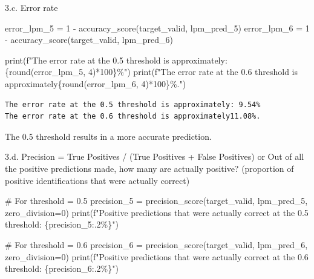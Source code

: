 \documentclass[
  11pt,
  letterpaper,
  DIV=11,
  numbers=noendperiod]{scrartcl}
\newenvironment{Shaded}{\begin{snugshade}}{\end{snugshade}}
\newcommand{\BuiltInTok}[1]{\textcolor[rgb]{0.00,0.23,0.31}{#1}}
\newcommand{\CommentTok}[1]{\textcolor[rgb]{0.37,0.37,0.37}{#1}}
\newcommand{\DecValTok}[1]{\textcolor[rgb]{0.68,0.00,0.00}{#1}}
\newcommand{\NormalTok}[1]{\textcolor[rgb]{0.00,0.23,0.31}{#1}}
\newcommand{\OperatorTok}[1]{\textcolor[rgb]{0.37,0.37,0.37}{#1}}
\newcommand{\SpecialCharTok}[1]{\textcolor[rgb]{0.37,0.37,0.37}{#1}}
\newcommand{\SpecialStringTok}[1]{\textcolor[rgb]{0.13,0.47,0.30}{#1}}
\begin{document}
3.c. Error rate

\begin{Shaded}
\begin{Highlighting}[]
\NormalTok{error\_lpm\_5 }\OperatorTok{=} \DecValTok{1} \OperatorTok{{-}}\NormalTok{ accuracy\_score(target\_valid, lpm\_pred\_5)}
\NormalTok{error\_lpm\_6 }\OperatorTok{=} \DecValTok{1} \OperatorTok{{-}}\NormalTok{ accuracy\_score(target\_valid, lpm\_pred\_6)}

\BuiltInTok{print}\NormalTok{(}\SpecialStringTok{f"The error rate at the 0.5 threshold is approximately: }\SpecialCharTok{\{}\BuiltInTok{round}\NormalTok{(error\_lpm\_5, }\DecValTok{4}\NormalTok{)}\OperatorTok{*}\DecValTok{100}\SpecialCharTok{\}}\SpecialStringTok{\%"}\NormalTok{)}
\BuiltInTok{print}\NormalTok{(}\SpecialStringTok{f"The error rate at the 0.6 threshold is approximately}\SpecialCharTok{\{}\BuiltInTok{round}\NormalTok{(error\_lpm\_6, }\DecValTok{4}\NormalTok{)}\OperatorTok{*}\DecValTok{100}\SpecialCharTok{\}}\SpecialStringTok{\%."}\NormalTok{)}
\end{Highlighting}
\end{Shaded}

\begin{verbatim}
The error rate at the 0.5 threshold is approximately: 9.54%
The error rate at the 0.6 threshold is approximately11.08%.
\end{verbatim}

The 0.5 threshold results in a more accurate prediction.

3.d. Precision = True Positives / (True Positives + False Positives) or
Out of all the positive predictions made, how many are actually
positive? (proportion of positive identifications that were actually
correct)

\begin{Shaded}
\begin{Highlighting}[]
\CommentTok{\# For threshold = 0.5}
\NormalTok{precision\_5 }\OperatorTok{=}\NormalTok{ precision\_score(target\_valid, lpm\_pred\_5, zero\_division}\OperatorTok{=}\DecValTok{0}\NormalTok{)}
\BuiltInTok{print}\NormalTok{(}\SpecialStringTok{f"Positive predictions that were actually correct at the 0.5 threshold: }\SpecialCharTok{\{}\NormalTok{precision\_5}\SpecialCharTok{:.2\%\}}\SpecialStringTok{"}\NormalTok{)}

\CommentTok{\# For threshold = 0.6}
\NormalTok{precision\_6 }\OperatorTok{=}\NormalTok{ precision\_score(target\_valid, lpm\_pred\_6, zero\_division}\OperatorTok{=}\DecValTok{0}\NormalTok{)}
\BuiltInTok{print}\NormalTok{(}\SpecialStringTok{f"Positive predictions that were actually correct at the 0.6 threshold: }\SpecialCharTok{\{}\NormalTok{precision\_6}\SpecialCharTok{:.2\%\}}\SpecialStringTok{"}\NormalTok{)}
\end{Highlighting}
\end{Shaded}
\end{document}
